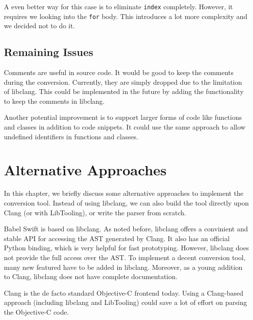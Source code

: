 \documentclass{sfuthesis}
\begin{document}
A even better way for this case is to eliminate \texttt{index} completely. However, it requires we looking into the \texttt{for} body. This introduces a lot more complexity and we decided not to do it.


%
%
%


\section{Remaining Issues}

Comments are useful in source code. It would be good to keep the comments during the conversion. Currently, they are simply dropped due to the limitation of libclang. This could be implemented in the future by adding the functionality to keep the comments in libclang.

Another potential improvement is to support larger forms of code like functions and classes in addition to code snippets. It could use the same approach to allow undefined identifiers in functions and classes.

\chapter{Alternative Approaches}

In this chapter, we briefly discuss some alternative approaches to implement the conversion tool. Instead of using libclang, we can also build the tool directly upon Clang (or with LibTooling), or write the parser from scratch.

Babel Swift is based on libclang. As noted before, libclang offers a convinient and stable API for accessing the AST generated by Clang. It also has an official Python binding, which is very helpful for fast prototyping. However, libclang does not provide the full access over the AST. To implement a decent conversion tool, many new featured have to be added in libclang. Moreover, as a young addition to Clang, libclang does not have complete documentation.

Clang is the de facto standard Objective-C frontend today. Using a Clang-based approach (including libclang and LibTooling) could save a lot of effort on parsing the Objective-C code.
\end{document}
